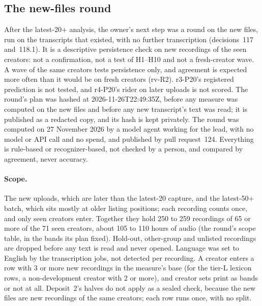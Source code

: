\clearpage\clearpage

\subsection{The new-files round}
\label{app:newfiles}

After the latest-20+ analysis, the owner's next step was a round on the new files, run on the transcripts that existed,
with no further transcription (decisions~117 and~118.1). It is a descriptive persistence check on new
recordings of the seen creators: not a confirmation, not a test of H1--H10 and not a fresh-creator wave. A wave of the
same creators tests persistence only, and agreement is expected more often than it would be on fresh creators (rv-R2).
r3-P20's registered prediction is not tested, and r4-P20's rider on later uploads is not scored. The round's plan was
hashed at 2026-11-26T22:49:35Z, before any measure was computed on the new files and before any new transcript's text
was read; it is published as a redacted copy, and its hash is kept privately. The round was computed on 27 November
2026 by a model agent working for the lead, with no model or API call and no spend, and published by pull
request~124. Everything is rule-based or recognizer-based, not checked by a person, and compared by agreement, never
accuracy.

\paragraph{Scope.} The new uploads, which are later than the latest-20 capture, and the latest-50+ batch, which sits
mostly at older listing positions; each recording counts once, and only seen creators enter. Together they hold 250 to
259 recordings of 65 or more of the 71 seen creators, about 105 to 110 hours of audio (the round's scope table, in the
bands its plan fixed). Hold-out, other-group and unlisted recordings are dropped before any text is read and never
opened. Language was set to English by the transcription jobs, not detected per recording. A creator enters a row with 3
or more new recordings in the measure's base (for the tier-L lexicon rows, a non-development creator with 2 or more),
and creator sets print as bands or not at all. Deposit~2's halves do not
apply as a sealed check, because the new files are new recordings of the same creators; each row runs once, with no
split.

